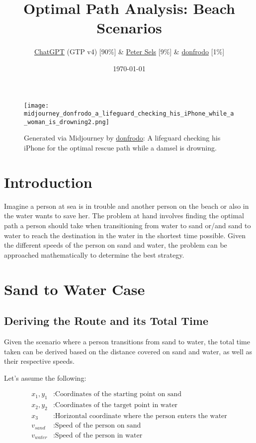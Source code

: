 \documentclass[11pt, a4paper]{article}
\title{Optimal Path Analysis: Beach Scenarios}
\author{\href{https://chat.openai.com/}{ChatGPT} (GTP v4) [90\%] \& \href{https://logicallyyours.com/}{Peter Sels} [9\%] \& \href{https://www.instagram.com/donfrodo/}{donfrodo} [1\%]}
\date{\today} %
\begin{document}
\maketitle


\begin{figure}[h]
\centering
\texttt{[image: midjourney\_donfrodo\_a\_lifeguard\_checking\_his\_iPhone\_while\_a\_woman\_is\_drowning2.png]}
\caption{Generated via Midjourney by \href{https://www.instagram.com/donfrodo/}{donfrodo}: A lifeguard checking his iPhone for the optimal rescue path while a damsel is drowning.}
\end{figure}


\newpage

\tableofcontents

\newpage

\section{Introduction}

Imagine a person at sea is in trouble and another person on the beach or also in the water wants to save her.
The problem at hand involves finding the optimal path a person should take when transitioning from water to sand
or/and sand to water to reach the destination in the water in the shortest time possible.
Given the different speeds of the person on sand and water,
the problem can be approached mathematically to determine the best strategy.

\section{Sand to Water Case}

\subsection{Deriving the Route and its Total Time}

Given the scenario where a person transitions from sand to water, the total time taken can be derived based on the
distance covered on sand and water, as well as their respective speeds.

Let's assume the following:

\begin{align*}
x_1, y_1 & : \text{Coordinates of the starting point on sand} \\
x_2, y_2 & : \text{Coordinates of the target point in water} \\
x_3 & : \text{Horizontal coordinate where the person enters the water} \\
v_{sand} & : \text{Speed of the person on sand} \\
v_{water} & : \text{Speed of the person in water}
\end{align*}
\end{document}
